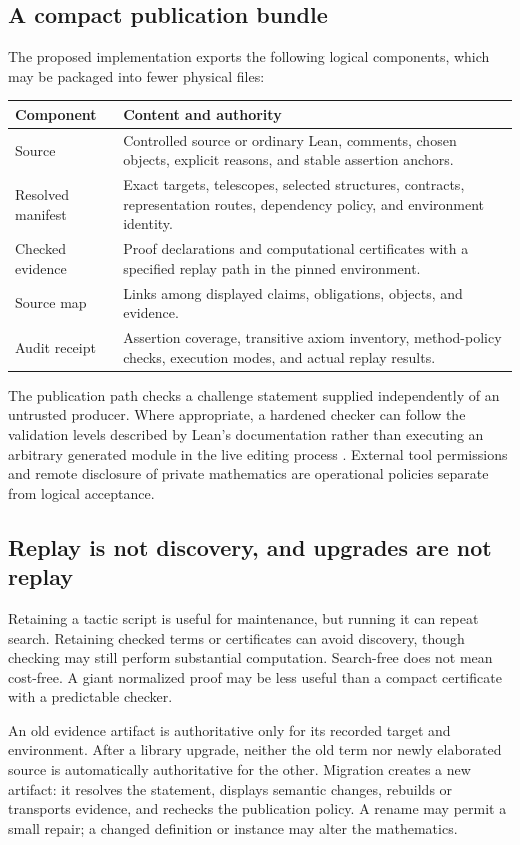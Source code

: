 \documentclass[11pt,letterpaper]{article}
\numberwithin{equation}{section}
\begin{document}
\subsection{A compact publication bundle}
The proposed implementation exports the following logical components, which may
be packaged into fewer physical files:

\begin{tabularx}{\textwidth}{@{}P{.25\textwidth}Y@{}}
\toprule
Component & Content and authority\\
\midrule
Source & Controlled source or ordinary Lean, comments, chosen objects, explicit
reasons, and stable assertion anchors.\\
Resolved manifest & Exact targets, telescopes, selected structures, contracts,
representation routes, dependency policy, and environment identity.\\
Checked evidence & Proof declarations and computational certificates with a
specified replay path in the pinned environment.\\
Source map & Links among displayed claims, obligations, objects, and evidence.\\
Audit receipt & Assertion coverage, transitive axiom inventory, method-policy
checks, execution modes, and actual replay results.\\
\bottomrule
\end{tabularx}


The publication path checks a challenge statement supplied independently of an
untrusted producer. Where appropriate, a hardened checker can follow the
validation levels described by Lean's documentation rather than executing an
arbitrary generated module in the live editing process \cite{lean-validation}.
External tool permissions and remote disclosure of private mathematics are
operational policies separate from logical acceptance.

\subsection{Replay is not discovery, and upgrades are not replay}
Retaining a tactic script is useful for maintenance, but running it can repeat
search. Retaining checked terms or certificates can avoid discovery, though
checking may still perform substantial computation. Search-free does not mean
cost-free. A giant normalized proof may be less useful than a compact certificate
with a predictable checker.

An old evidence artifact is authoritative only for its recorded target and
environment. After a library upgrade, neither the old term nor newly elaborated
source is automatically authoritative for the other. Migration creates a new
artifact: it resolves the statement, displays semantic changes, rebuilds or
transports evidence, and rechecks the publication policy. A rename may permit a
small repair; a changed definition or instance may alter the mathematics.
\end{document}
